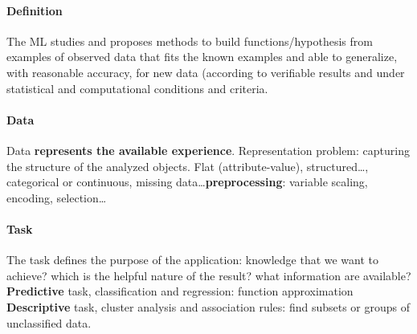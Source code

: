 \documentclass[10pt]{report}
\begin{document}
\paragraph{Definition} The ML studies and proposes methods to build functions/hypothesis from examples of observed data that fits the known examples and able to generalize, with reasonable accuracy, for new data (according to verifiable results and under statistical and computational conditions and criteria.
\paragraph{Data} Data \textbf{represents the available experience}. Representation problem: capturing the structure of the analyzed objects. Flat (attribute-value), structured\ldots, categorical or continuous, missing data\ldots \textbf{preprocessing}: variable scaling, encoding, selection\ldots
\paragraph{Task} The task defines the purpose of the application: knowledge that we want to achieve? which is the helpful nature of the result? what information are available?\\
\textbf{Predictive} task, classification and regression: function approximation\\
\textbf{Descriptive} task, cluster analysis and association rules: find subsets or groups of unclassified data.
\end{document}
